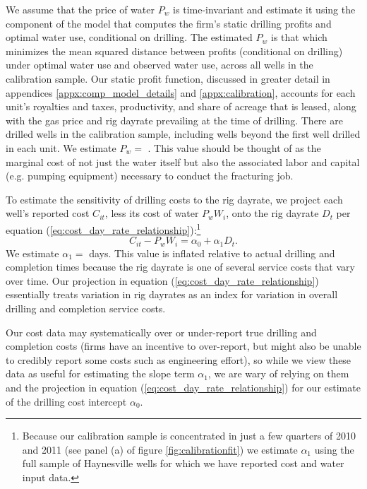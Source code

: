 \documentclass[12pt]{article}
\begin{document}
We assume that the price of water $P_w$ is time-invariant and estimate it using the component of the model that computes the firm's static drilling profits and optimal water use, conditional on drilling. The estimated $P_w$ is that which minimizes the mean squared distance between profits (conditional on drilling) under optimal water use and observed water use, across all wells in the calibration sample. Our static profit function, discussed in greater detail in appendices \ref{appx:comp_model_details} and \ref{appx:calibration}, accounts for each unit's royalties and taxes, productivity, and share of acreage that is leased, along with the gas price and rig dayrate prevailing at the time of drilling. There are drilled wells in the calibration sample, including wells beyond the first well drilled in each unit. We estimate $P_w=$ \unskip. This value should be thought of as the marginal cost of not just the water itself but also the associated labor and capital (e.g. pumping equipment) necessary to conduct the fracturing job.

To estimate the sensitivity of drilling costs to the rig dayrate, we project each well's reported cost $C_{it}$, less its cost of water $P_w W_i$, onto the rig dayrate $D_t$ per equation (\ref{eq:cost_day_rate_relationship}):\footnote{Because our calibration sample is concentrated in just a few quarters of 2010 and 2011 (see panel (a) of figure \ref{fig:calibrationfit}) we estimate $\alpha_1$ using the full sample of Haynesville wells for which we have reported cost and water input data.} 
\begin{equation}
C_{it} - P_w W_i = \alpha_0 + \alpha_1 D_t.
\label{eq:cost_day_rate_relationship}
\end{equation}
\noindent We estimate $\alpha_1 = $ \unskip\space days. This value is inflated relative to actual drilling and completion times because the rig dayrate is one of several service costs that vary over time. Our projection in equation (\ref{eq:cost_day_rate_relationship}) essentially treats variation in rig dayrates as an index for variation in overall drilling and completion service costs.

Our cost data may systematically over or under-report true drilling and completion costs (firms have an incentive to over-report, but might also be unable to credibly report some costs such as engineering effort), so while we view these data as useful for estimating the slope term $\alpha_1$, we are wary of relying on them and the projection in equation (\ref{eq:cost_day_rate_relationship}) for our estimate of the drilling cost intercept $\alpha_0$.
\end{document}
